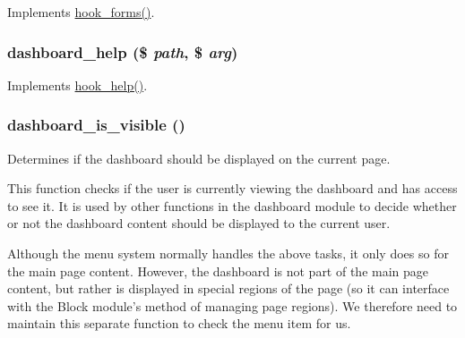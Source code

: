 \label{dashboard_8module_ac9d916ce89f60f399c96ace265743115}
Implements \hyperlink{group__hooks_gaa764fee74b85797f75c0c923cad628d5}{hook\_\-forms()}. \hypertarget{dashboard_8module_a5156a3b29dbbd20299db17270ca1376f}{
\subsubsection[{dashboard\_\-help}]{\setlength{\rightskip}{0pt plus 5cm}dashboard\_\-help (\$ {\em path}, \/  \$ {\em arg})}}
\label{dashboard_8module_a5156a3b29dbbd20299db17270ca1376f}
Implements \hyperlink{group__hooks_ga5589c2714a782738e8851c4c90231f0e}{hook\_\-help()}. \hypertarget{dashboard_8module_ac63a42b45d92441592f7945f320cbd52}{
\subsubsection[{dashboard\_\-is\_\-visible}]{\setlength{\rightskip}{0pt plus 5cm}dashboard\_\-is\_\-visible ()}}
\label{dashboard_8module_ac63a42b45d92441592f7945f320cbd52}
Determines if the dashboard should be displayed on the current page.

This function checks if the user is currently viewing the dashboard and has access to see it. It is used by other functions in the dashboard module to decide whether or not the dashboard content should be displayed to the current user.

Although the menu system normally handles the above tasks, it only does so for the main page content. However, the dashboard is not part of the main page content, but rather is displayed in special regions of the page (so it can interface with the Block module's method of managing page regions). We therefore need to maintain this separate function to check the menu item for us.

